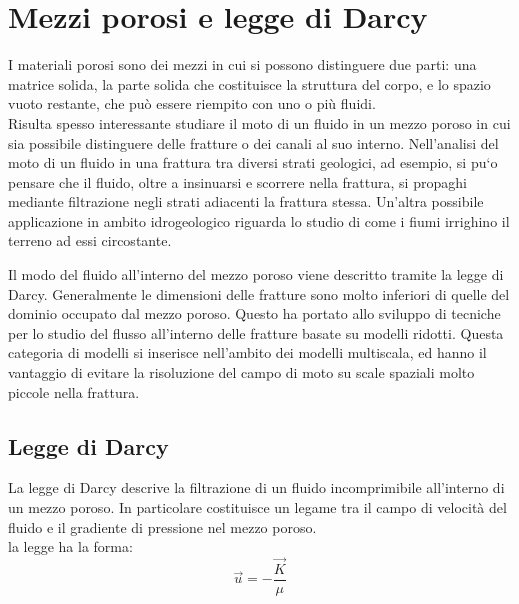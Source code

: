 \chapter{Mezzi porosi e legge di Darcy}

I materiali porosi sono dei mezzi in cui si possono distinguere due parti: una matrice solida, la parte solida che costituisce la struttura del corpo, e lo spazio vuoto restante, che può essere riempito con uno o più fluidi. \\
Risulta spesso interessante studiare il moto di un fluido in un mezzo poroso in cui sia possibile distinguere delle fratture o dei canali al suo interno. Nell'analisi del moto di un fluido in una frattura tra diversi strati geologici, ad esempio,  si pu`o pensare che il fluido, oltre a insinuarsi e scorrere nella frattura, si propaghi mediante filtrazione negli strati adiacenti la frattura stessa.
Un'altra possibile applicazione in ambito idrogeologico riguarda lo studio di come i fiumi irrighino il terreno ad essi circostante. 
\par Il modo del fluido all'interno del mezzo poroso viene descritto tramite la legge di Darcy.  Generalmente le dimensioni delle fratture sono molto inferiori di quelle del dominio occupato dal mezzo poroso. Questo ha portato allo sviluppo di tecniche per lo studio del flusso all'interno delle fratture basate su modelli ridotti. Questa categoria di modelli si inserisce nell'ambito dei modelli multiscala, ed hanno il vantaggio di evitare la risoluzione del campo di moto su scale spaziali molto piccole nella frattura.

\section{Legge di Darcy}
La legge di Darcy descrive la filtrazione di un fluido incomprimibile all'interno di un mezzo poroso. In particolare costituisce un legame tra il campo di velocità del fluido e il gradiente di pressione nel mezzo poroso. \\
la legge ha la forma:
\begin{equation}
\vec{u} =- \frac{\vec{K}}{\mu}
\end{equation}



